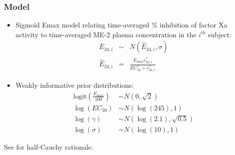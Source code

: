 \documentclass{beamer}
\begin{document}
\begin{frame}
  \frametitle{Model}
  
\begin{itemize}
\item Sigmoid Emax model relating time-averaged \% inhibition of factor Xa activity to time-averaged ME-2 plasma concentration in the $i^{th}$ subject:
\begin{eqnarray*}
\overline{E}_{24,i} &\sim& N\left(\hat{E}_{24,i},\sigma\right) \\
\hat{E}_{24,i} &=& \frac{E_{max} \overline{c}_{24,i}^\gamma}{EC_{50}^\gamma + \overline{c}_{24,i}^\gamma}
\end{eqnarray*}
\item Weakly informative prior distributions:
  \begin{align*}
    \text{logit}\left(\frac{E_{max}}{100}\right) &\sim N\left(0,
                                                   \sqrt{2}\right) \\
    \log\left(EC_{50}\right)  &\sim N\left(\log(245), 1\right) \\
\log\left(\gamma\right) &\sim N\left(\log(2.1), \sqrt{0.5}\right) \\
\log\left(\sigma\right) &\sim N\left(\log(10), 1\right)
  \end{align*}
\end{itemize}
{\scriptsize See \cite{gelman2006} for half-Cauchy rationale.}

\end{frame}
\end{document}
